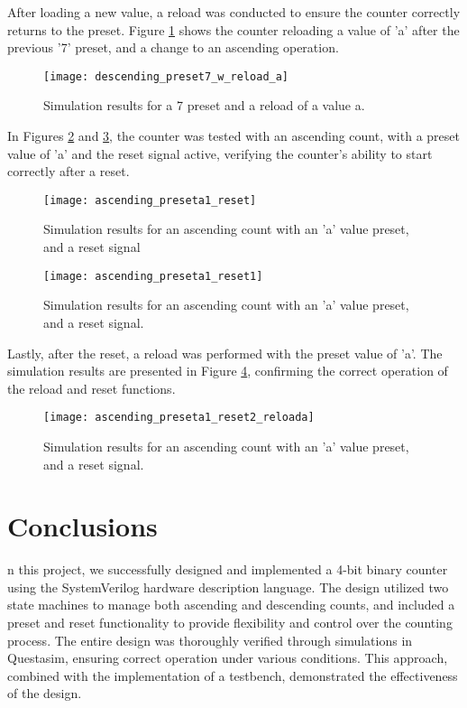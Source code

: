 \documentclass[conference]{IEEEtran}
\begin{document}
	After loading a new value, a reload was conducted to ensure the counter correctly returns to the preset. Figure \ref{fig:descendingpreset7wreloada} shows the counter reloading a value of 'a' after the previous '7' preset, and a change to an ascending operation.
	
	\begin{figure}[H]
		\centering
		\texttt{[image: descending\_preset7\_w\_reload\_a]}
		\caption{Simulation results for a 7 preset and a reload of a value a.}
		\label{fig:descendingpreset7wreloada}
	\end{figure}
	
	In Figures \ref{fig:ascendingpreseta1reset} and \ref{fig:ascendingpreseta1reset1}, the counter was tested with an ascending count, with a preset value of 'a' and the reset signal active, verifying the counter's ability to start correctly after a reset.
	
	\begin{figure}[H]
		\centering
		\texttt{[image: ascending\_preseta1\_reset]}
		\caption{Simulation results for an ascending count with an 'a' value preset, and a reset signal}
		\label{fig:ascendingpreseta1reset}
	\end{figure}
	
	\begin{figure}[H]
		\centering
		\texttt{[image: ascending\_preseta1\_reset1]}
		\caption{Simulation results for an ascending count with an 'a' value preset, and a reset signal.}
		\label{fig:ascendingpreseta1reset1}
	\end{figure}
	
	Lastly, after the reset, a reload was performed with the preset value of 'a'. The simulation results are presented in Figure \ref{fig:ascendingpreseta1reset2reloada}, confirming the correct operation of the reload and reset functions.
	
	\begin{figure}[H]
		\centering
		\texttt{[image: ascending\_preseta1\_reset2\_reloada]}
		\caption{Simulation results for an ascending count with an 'a' value preset, and a reset signal.}
		\label{fig:ascendingpreseta1reset2reloada}
	\end{figure}
	
	\section{Conclusions}
	n this project, we successfully designed and implemented a 4-bit binary counter using the SystemVerilog hardware description language. The design utilized two state machines to manage both ascending and descending counts, and included a preset and reset functionality to provide flexibility and control over the counting process. The entire design was thoroughly verified through simulations in Questasim, ensuring correct operation under various conditions.
	This approach, combined with the implementation of a testbench, demonstrated the effectiveness of the design.
	
	
	
	
	
	
	
	
	
	
	
	
\end{document}
